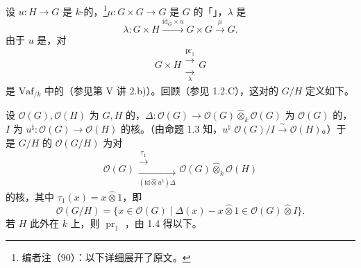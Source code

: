 设 $u:H\to G$ 是 $k$-的，\footnote{编者注（90）：以下详细展开了原文。}$\mu:G\times G\to G$ 是 $G$ 的「」，$\lambda$ 是
\[
\lambda:G\times H\xrightarrow{\mathrm{id}_G\times u}G\times G\xrightarrow{\mu}G.
\]
由于 $u$ 是，对
\[
G\times H\mathrel{\substack{\xrightarrow{\operatorname{pr}_1}\\[-.6ex]\xrightarrow[\lambda]{}}}G
\]
是 $\mathrm{Vaf}_{/k}$ 中的（参见第 V 讲 2.b)）。回顾（参见 1.2.C），这对的 $G/H$ 定义如下。

设 $\mathscr O(G),\mathscr O(H)$ 为 $G,H$ 的，$\Delta:\mathscr O(G)\to\mathscr O(G)\widehat\otimes_k\mathscr O(G)$ 为 $\mathscr O(G)$ 的，$I$ 为 $u^\natural:\mathscr O(G)\to\mathscr O(H)$ 的核。（由命题 1.3 知，$u^\natural$  $\mathscr O(G)/I\xrightarrow\sim\mathscr O(H)$。）于是 $G/H$ 的 $\mathscr O(G/H)$ 为对
\[
\mathscr O(G)\mathrel{\substack{\xrightarrow{\tau_1}\\[-.6ex]\xrightarrow[(\mathrm{id}\widehat\otimes u^\natural)\Delta]{}}}\mathscr O(G)\widehat\otimes_k\mathscr O(H)
\]
的核，其中 $\tau_1(x)=x\widehat\otimes1$，即
\[
\mathscr O(G/H)=\{x\in\mathscr O(G)\mid\Delta(x)-x\widehat\otimes1\in\mathscr O(G)\widehat\otimes I\}.
\]
若 $H$ 此外在 $k$ 上，则 $\operatorname{pr}_1$ ，由 1.4 得以下。

